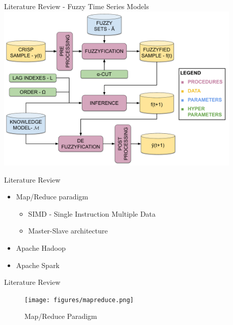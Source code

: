 \documentclass{beamer}
\begin{document}

\begin{frame}{Literature Review - Fuzzy Time Series Models}
\includegraphics[width=\textwidth,height=8cm]{figures/fts_forecasting.pdf}
\end{frame}



\begin{frame}{Literature Review}
\linespread{2}
\begin{itemize}
\item Map/Reduce paradigm\cite{Dean2008}
\begin{itemize}
    \item SIMD - Single Instruction Multiple Data
    \item Master-Slave architecture
\end{itemize}
\item Apache Hadoop\cite{White2012}
\item Apache Spark
\end{itemize}
\end{frame}

\note[itemize]{
\item 
}


\begin{frame}{Literature Review}

\begin{figure}
    \centering
    \texttt{[image: figures/mapreduce.png]}
    \caption{Map/Reduce Paradigm \cite{Dean2008}}
    \label{fig:my_label}
\end{figure}

\end{frame}
\end{document}
